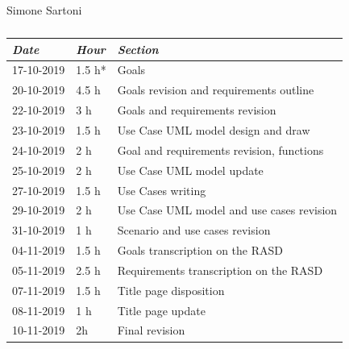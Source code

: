 \documentclass[a4paper]{report}
\begin{document}
\vspace*{1 cm}
\begin{table}[H]
\centering
Simone Sartoni \\
\begin{tabular}{p{2cm}p{1.5cm}p{7cm}}
\toprule
\textit{Date} & \textit{Hour} & \textit{Section} \\ \midrule
17-10-2019 & 1.5 h* & Goals \\ \midrule
20-10-2019 & 4.5 h & Goals revision and requirements outline  \\ \midrule
22-10-2019 & 3 h & Goals and requirements revision \\ \midrule
23-10-2019 & 1.5 h & Use Case UML model design and draw \\ \midrule
24-10-2019 & 2 h & Goal and requirements revision, functions \\ \midrule
25-10-2019 & 2 h & Use Case UML model update \\ \midrule
27-10-2019 & 1.5 h & Use Cases writing \\ \midrule
29-10-2019 & 2 h & Use Case UML model and use cases revision \\ \midrule
31-10-2019 & 1 h & Scenario and use cases revision \\ \midrule
04-11-2019 & 1.5 h & Goals transcription on the RASD \\ \midrule
05-11-2019 & 2.5 h & Requirements transcription on the RASD \\ \midrule
07-11-2019 & 1.5 h & Title page disposition \\ \midrule
08-11-2019 & 1 h & Title page update \\ \midrule
10-11-2019 & 2h & Final revision \\
\bottomrule
\end{tabular}
\caption[Simone Sartoni's effort table]{}
\end{table}
\vspace*{1 cm}
\end{document}
